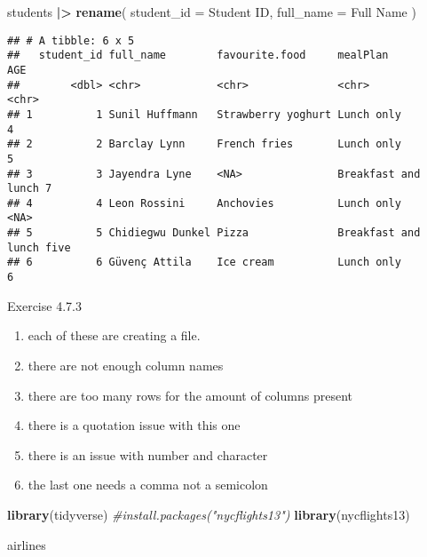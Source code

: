 \documentclass[
]{article}
\newenvironment{Shaded}{\begin{snugshade}}{\end{snugshade}}
\newcommand{\AttributeTok}[1]{\textcolor[rgb]{0.13,0.29,0.53}{#1}}
\newcommand{\CommentTok}[1]{\textcolor[rgb]{0.56,0.35,0.01}{\textit{#1}}}
\newcommand{\FunctionTok}[1]{\textcolor[rgb]{0.13,0.29,0.53}{\textbf{#1}}}
\newcommand{\NormalTok}[1]{#1}
\newcommand{\SpecialCharTok}[1]{\textcolor[rgb]{0.81,0.36,0.00}{\textbf{#1}}}
\newcommand{\StringTok}[1]{\textcolor[rgb]{0.31,0.60,0.02}{#1}}
\providecommand{\tightlist}{%
  \setlength{\itemsep}{0pt}\setlength{\parskip}{0pt}}
\begin{document}
\begin{Shaded}
\begin{Highlighting}[]
\NormalTok{students }\SpecialCharTok{|\textgreater{}}
  \FunctionTok{rename}\NormalTok{(}
    \AttributeTok{student\_id =} \StringTok{\textquotesingle{}Student ID\textquotesingle{}}\NormalTok{,}
    \AttributeTok{full\_name =} \StringTok{\textquotesingle{}Full Name\textquotesingle{}}
\NormalTok{         )}
\end{Highlighting}
\end{Shaded}

\begin{verbatim}
## # A tibble: 6 x 5
##   student_id full_name        favourite.food     mealPlan            AGE  
##        <dbl> <chr>            <chr>              <chr>               <chr>
## 1          1 Sunil Huffmann   Strawberry yoghurt Lunch only          4    
## 2          2 Barclay Lynn     French fries       Lunch only          5    
## 3          3 Jayendra Lyne    <NA>               Breakfast and lunch 7    
## 4          4 Leon Rossini     Anchovies          Lunch only          <NA> 
## 5          5 Chidiegwu Dunkel Pizza              Breakfast and lunch five 
## 6          6 Güvenç Attila    Ice cream          Lunch only          6
\end{verbatim}

Exercise 4.7.3

\begin{enumerate}
\def\labelenumi{\arabic{enumi}.}
\tightlist
\item
  each of these are creating a file.
\item
  there are not enough column names
\item
  there are too many rows for the amount of columns present
\item
  there is a quotation issue with this one
\item
  there is an issue with number and character
\item
  the last one needs a comma not a semicolon
\end{enumerate}

\begin{Shaded}
\begin{Highlighting}[]
\FunctionTok{library}\NormalTok{(tidyverse)}
\CommentTok{\#install.packages("nycflights13")}
\FunctionTok{library}\NormalTok{(nycflights13)}

\NormalTok{airlines}
\end{Highlighting}
\end{Shaded}
\end{document}
